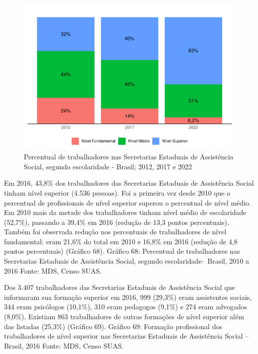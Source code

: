 \documentclass[
  brazilian]{report}
\begin{document}
\begin{figure}
\includegraphics{Censo-SUAS-2022_files/figure-latex/uf_trab_form-1} \caption[Percentual de trabalhadores nas Secretarias Estaduais de Assistência Social, segundo escolaridade - Brasil]{Percentual de trabalhadores nas Secretarias Estaduais de Assistência Social, segundo escolaridade - Brasil; 2012, 2017 e 2022}\label{fig:uf_trab_form}
\end{figure}

Em 2016, 43,8\% dos trabalhadores das Secretarias Estaduais de
Assistência Social tinham nível superior (4.536 pessoas). Foi a primeira
vez desde 2010 que o percentual de profissionais de nível superior
superou o percentual de nível médio. Em 2010 mais da metade dos
trabalhadores tinham nível médio de escolaridade (52,7\%), passando a
39,4\% em 2016 (redução de 13,3 pontos percentuais). Também foi
observada redução nos percentuais de trabalhadores de nível fundamental:
eram 21,6\% do total em 2010 e 16,8\% em 2016 (redução de 4,8 pontos
percentuais) (Gráfico 68). Gráfico 68: Percentual de trabalhadores nas
Secretarias Estaduais de Assistência Social, segundo escolaridade--
Brasil, 2010 a 2016 Fonte: MDS, Censo SUAS.

Dos 3.407 trabalhadores das Secretarias Estaduais de Assistência Social
que informaram sua formação superior em 2016, 999 (29,3\%) eram
assistentes sociais, 344 eram psicólogos (10,1\%), 310 eram pedagogos
(9,1\%) e 274 eram advogados (8,0\%). Existiam 863 trabalhadores de
outras formações de nível superior além das listadas (25,3\%) (Gráfico
69). Gráfico 69: Formação profissional dos trabalhadores de nível
superior nas Secretarias Estaduais de Assistência Social -- Brasil, 2016
Fonte: MDS, Censo SUAS.
\end{document}
